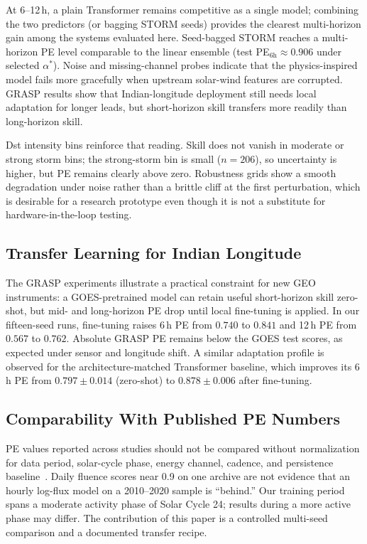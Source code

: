 \documentclass{ieeeaccess}
\begin{document}
At 6--12\,h, a plain Transformer remains competitive as a
single model; combining the two predictors (or bagging STORM seeds)
provides the clearest multi-horizon gain among the systems evaluated here.
Seed-bagged STORM reaches a multi-horizon PE level comparable to the linear ensemble (test PE\(_{6\mathrm{h}} \approx 0.906\) under selected \(\alpha^*\)).
Noise and missing-channel probes indicate that the physics-inspired model
fails more gracefully when upstream solar-wind features are corrupted.
GRASP results show that Indian-longitude deployment still needs local
adaptation for longer leads, but short-horizon skill transfers more
readily than long-horizon skill.

Dst intensity bins reinforce that reading. Skill does not vanish in moderate or
strong storm bins; the strong-storm bin is small (\(n=206\)), so uncertainty is
higher, but PE remains clearly above zero. Robustness grids show a smooth
degradation under noise rather than a brittle cliff at the first perturbation,
which is desirable for a research prototype even though it is not a substitute
for hardware-in-the-loop testing.

\subsection{Transfer Learning for Indian Longitude}
The GRASP experiments illustrate a practical constraint for new GEO instruments:
a GOES-pretrained model can retain useful short-horizon skill zero-shot, but
mid- and long-horizon PE drop until local fine-tuning is applied.
In our fifteen-seed runs, fine-tuning raises 6\,h PE from \(0.740\) to \(0.841\) and 12\,h PE from \(0.567\) to \(0.762\). Absolute GRASP PE
remains below the GOES test scores, as expected under sensor and longitude shift. A similar adaptation profile is observed for the architecture-matched Transformer baseline, which improves its 6\,h PE from \(0.797 \pm 0.014\) (zero-shot) to \(0.878 \pm 0.006\) after fine-tuning.

\subsection{Comparability With Published PE Numbers}
PE values reported across studies should not be compared without normalization
for data period, solar-cycle phase, energy channel, cadence, and persistence
baseline~\cite{b21,b22}. Daily fluence scores near 0.9 on one archive are not
evidence that an hourly log-flux model on a 2010--2020 sample is ``behind.'' Our training
period spans a moderate activity phase of Solar Cycle 24; results during a more
active phase may differ. The contribution of this paper is a controlled
multi-seed comparison and a documented transfer recipe.
\end{document}
